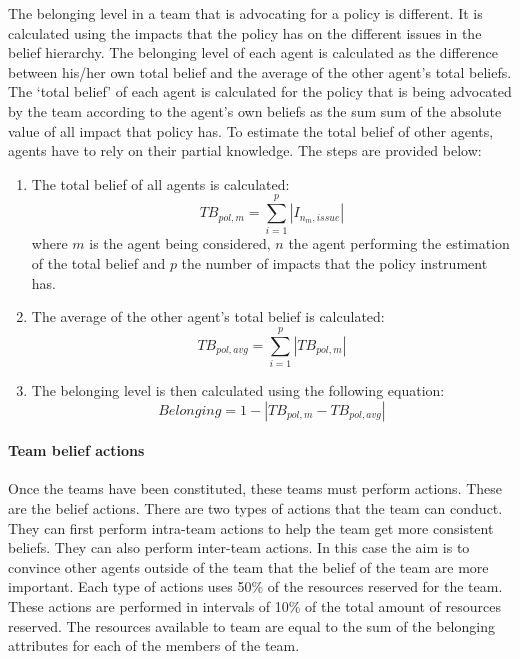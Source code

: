 The belonging level in a team that is advocating for a policy is different. It is calculated using the impacts that the policy has on the different issues in the belief hierarchy. The belonging level of each agent is calculated as the difference between his/her own total belief and the average of the other agent’s total beliefs. The ‘total belief’ of each agent is calculated for the policy that is being advocated by the team according to the agent’s own beliefs as the sum sum of the absolute value of all impact that policy has. To estimate the total belief of other agents, agents have to rely on their partial knowledge. The steps are provided below:

\begin{enumerate}
\item The total belief of all agents is calculated:
	\begin{equation}
	TB_{pol, m} = \sum_{i=1}^p |I_{n_m, issue}|
	\end{equation}
	where $m$ is the agent being considered, $n$ the agent performing the estimation of the total belief and $p$ the number of impacts that the policy instrument has.

\item The average of the other agent’s total belief is calculated:
	\begin{equation}
	TB_{pol, avg} = \sum_{i=1}^p |TB_{pol,m}|
	\end{equation}

\item The belonging level is then calculated using the following equation:
	\begin{equation}
	Belonging = 1 - \left| TB_{pol,m} - TB_{pol, avg} \right|
	\end{equation}
\end{enumerate}


\paragraph{Team belief actions}


Once the teams have been constituted, these teams must perform actions. These are the belief actions. There are two types of actions that the team can conduct. They can first perform intra-team actions to help the team get more consistent beliefs. They can also perform inter-team actions. In this case the aim is to convince other agents outside of the team that the belief of the team are more important. Each type of actions uses 50\% of the resources reserved for the team. These actions are performed in intervals of 10\% of the total amount of resources reserved. The resources available to team are equal to the sum of the belonging attributes for each of the members of the team.


